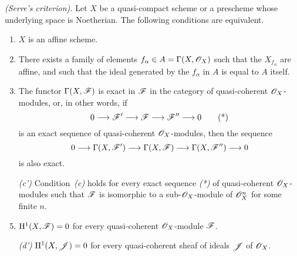 \begin{thm}[5.2.1]
\label{2.5.2.1}
\emph{(Serre's criterion).}
Let $X$ be a quasi-compact scheme or a prescheme whose underlying space is Noetherian.
The following conditions are equivalent.
\begin{enumerate}[label=\emph{(\alph*)}]
    \item $X$ is an affine scheme.
    \item There exists a family of elements $f_\alpha\in A=\Gamma(X,\mathscr{O}_X)$ such that the $X_{f_\alpha}$ are affine, and such that the ideal generated by the $f_\alpha$ in $A$ is equal to $A$ itself.
    \item The functor $\Gamma(X,\mathscr{F})$ is exact in $\mathscr{F}$ in the category of quasi-coherent $\mathscr{O}_X$-modules, or, in other words, if
        \begin{equation*}
            0\to\sh{F}'\to\sh{F}\to\sh{F}''\to0\tag{*}
        \end{equation*}
        is an exact sequence of quasi-coherent $\mathscr{O}_X$-modules, then the sequence
        \[
            0\to\Gamma(X,\sh{F}')\to\Gamma(X,\sh{F})\to\Gamma(X,\sh{F}'')\to0
        \]
        is also exact.
    \item[\emph{(c')}] Condition~\emph{(c)} holds for every exact sequence \emph{(*)} of quasi-coherent $\mathscr{O}_X$-modules such that $\mathscr{F}$ is isomorphic to a sub-$\mathscr{O}_X$-module of $\mathscr{O}_X^n$ for some finite $n$.
    \item $\mathrm{H}^1(X,\mathscr{F})=0$ for every quasi-coherent $\mathscr{O}_X$-module $\mathscr{F}$.
    \item[\emph{(d')}] $\mathrm{H}^1(X,\mathscr{J})=0$ for every quasi-coherent sheaf of ideals $\mathscr{J}$ of $\mathscr{O}_X$.
\end{enumerate}
\end{thm}

